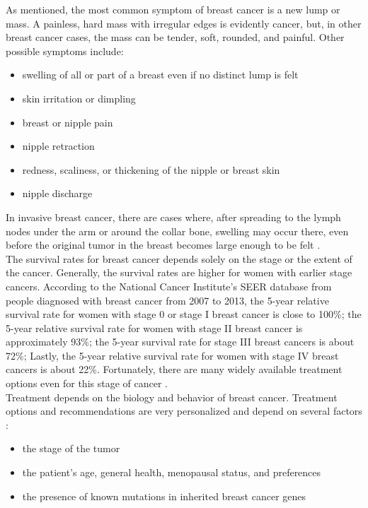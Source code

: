 	As mentioned, the most common symptom of breast cancer is a new lump or mass. A painless, hard mass with irregular edges is evidently cancer, but, in other breast cancer cases, the mass can be tender, soft, rounded, and painful. Other possible symptoms include:

\begin{itemize}
	\item swelling of all or part of a breast even if no distinct lump is felt
	\item skin irritation or dimpling
	\item breast or nipple pain
	\item nipple retraction
	\item redness, scaliness, or thickening of the nipple or breast skin
	\item nipple discharge
\end{itemize}

	In invasive breast cancer, there are cases where, after spreading to the lymph nodes under the arm or around the collar bone, swelling may occur there, even before the original tumor in the breast becomes large enough to be felt \cite{ACSSymptoms}. \\

	The survival rates for breast cancer depends solely on the stage or the extent of the cancer. Generally, the survival rates are higher for women with earlier stage cancers. According to the National Cancer Institute's SEER database from people diagnosed with breast cancer from 2007 to 2013, the 5-year relative survival rate for women with stage 0 or stage I breast cancer is close to 100\%; the 5-year relative survival rate for women with stage II breast cancer is approximately 93\%; the 5-year survival rate for stage III breast cancers is about 72\%; Lastly, the 5-year relative survival rate for women with stage IV breast cancers is about 22\%. Fortunately, there are many widely available treatment options even for this stage of cancer \cite{cancerPrognosis}. \\

	Treatment depends on the biology and behavior of breast cancer. Treatment options and recommendations are very personalized and depend on several factors \cite{cancerTreatmentSpecific}:

\begin{itemize}
	\item the stage of the tumor
	\item the patient's age, general health, menopausal status, and preferences
	\item the presence of known mutations in inherited breast cancer genes
\end{itemize}

